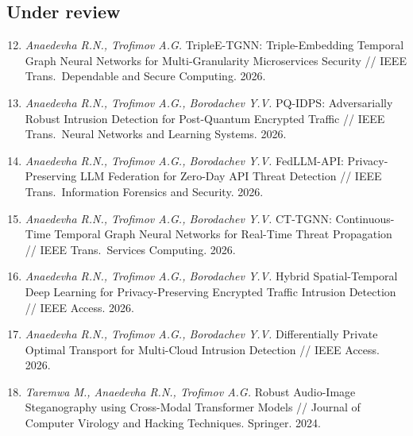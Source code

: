 \documentclass[12pt,a5paper]{article}
\begin{document}
\subsection*{Under review}

\begin{enumerate}
\setcounter{enumi}{11}
\item \textit{Anaedevha R.N., Trofimov A.G.} TripleE-TGNN: Triple-Embedding Temporal Graph Neural Networks for Multi-Granularity Microservices Security // IEEE Trans.\ Dependable and Secure Computing. 2026.

\item \textit{Anaedevha R.N., Trofimov A.G., Borodachev Y.V.} PQ-IDPS: Adversarially Robust Intrusion Detection for Post-Quantum Encrypted Traffic // IEEE Trans.\ Neural Networks and Learning Systems. 2026.

\item \textit{Anaedevha R.N., Trofimov A.G., Borodachev Y.V.} FedLLM-API: Privacy-Preserving LLM Federation for Zero-Day API Threat Detection // IEEE Trans.\ Information Forensics and Security. 2026.

\item \textit{Anaedevha R.N., Trofimov A.G., Borodachev Y.V.} CT-TGNN: Continuous-Time Temporal Graph Neural Networks for Real-Time Threat Propagation // IEEE Trans.\ Services Computing. 2026.

\item \textit{Anaedevha R.N., Trofimov A.G., Borodachev Y.V.} Hybrid Spatial-Temporal Deep Learning for Privacy-Preserving Encrypted Traffic Intrusion Detection // IEEE Access. 2026.

\item \textit{Anaedevha R.N., Trofimov A.G., Borodachev Y.V.} Differentially Private Optimal Transport for Multi-Cloud Intrusion Detection // IEEE Access. 2026.

\item \textit{Taremwa M., Anaedevha R.N., Trofimov A.G.} Robust Audio-Image Steganography using Cross-Modal Transformer Models // Journal of Computer Virology and Hacking Techniques. Springer. 2024.
\end{enumerate}
\end{document}

